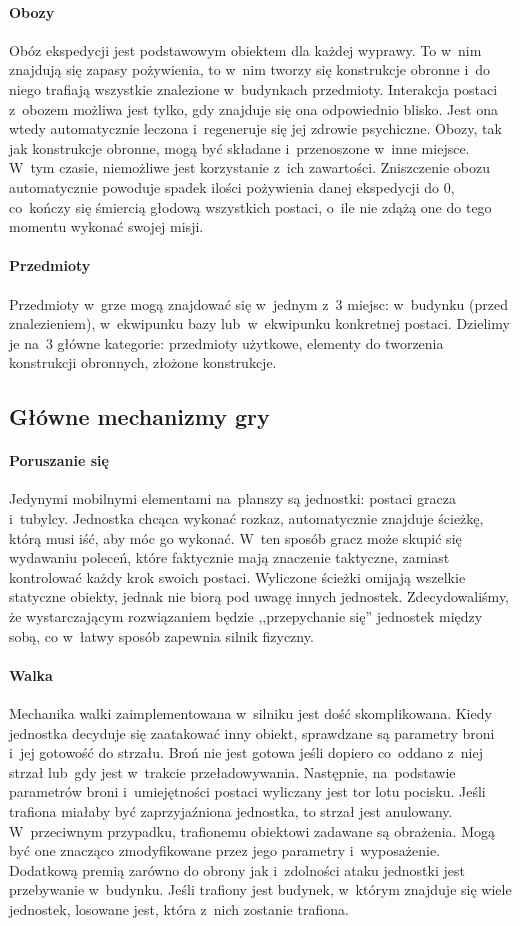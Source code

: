 \documentclass[licencjacka]{pracamgr}
\begin{document}
      \paragraph{Obozy}
	Obóz ekspedycji jest podstawowym obiektem dla każdej wyprawy. To w~nim znajdują się zapasy pożywienia, to w~nim tworzy
	się konstrukcje obronne i~do niego trafiają wszystkie znalezione w~budynkach przedmioty. Interakcja postaci z~obozem
	możliwa jest tylko, gdy znajduje się ona odpowiednio blisko. Jest ona wtedy automatycznie leczona i~regeneruje się
	jej zdrowie psychiczne. Obozy, tak jak konstrukcje obronne, mogą być składane i~przenoszone w~inne miejsce. W~tym czasie,
	niemożliwe jest korzystanie z~ich zawartości. Zniszczenie obozu automatycznie powoduje spadek ilości pożywienia danej
	ekspedycji do 0, co~kończy się śmiercią głodową wszystkich postaci, o~ile nie zdążą one do tego momentu wykonać swojej misji.
      \paragraph{Przedmioty}
	Przedmioty w~grze mogą znajdować się w~jednym z~3 miejsc: w~budynku (przed znalezieniem), w~ekwipunku bazy lub~w~ekwipunku konkretnej
	postaci. Dzielimy je na~3 główne kategorie: przedmioty użytkowe, elementy do tworzenia konstrukcji obronnych, złożone konstrukcje.

    \subsection{Główne mechanizmy gry}
      \paragraph{Poruszanie się}
	Jedynymi mobilnymi elementami na~planszy są jednostki: postaci gracza i~tubylcy. Jednostka chcąca wykonać rozkaz, automatycznie znajduje
	ścieżkę, którą musi iść, aby móc go wykonać. W~ten sposób gracz może skupić się wydawaniu poleceń, które faktycznie mają
	znaczenie taktyczne, zamiast kontrolować każdy krok swoich postaci. Wyliczone ścieżki omijają wszelkie statyczne obiekty, jednak
	nie biorą pod uwagę innych jednostek. Zdecydowaliśmy, że wystarczającym rozwiązaniem będzie ,,przepychanie się'' jednostek między sobą,
	co w~łatwy sposób zapewnia silnik fizyczny.
      \paragraph{Walka}
	Mechanika walki zaimplementowana w~silniku jest dość skomplikowana. Kiedy jednostka decyduje się zaatakować inny obiekt,
	sprawdzane są parametry broni i~jej gotowość do strzału. Broń nie jest gotowa jeśli dopiero co~oddano z~niej strzał lub~gdy
	jest w~trakcie przeładowywania. Następnie, na~podstawie parametrów broni i~umiejętności postaci wyliczany jest tor lotu pocisku.
	Jeśli trafiona miałaby być zaprzyjaźniona jednostka, to strzał jest anulowany. W~przeciwnym przypadku, trafionemu obiektowi zadawane są
	obrażenia. Mogą być one znacząco zmodyfikowane przez jego parametry i~wyposażenie. Dodatkową premią zarówno do obrony jak i~zdolności
	ataku jednostki jest przebywanie w~budynku. Jeśli trafiony jest budynek, w~którym znajduje się wiele jednostek, losowane jest, która z~nich
	zostanie trafiona.
\end{document}

